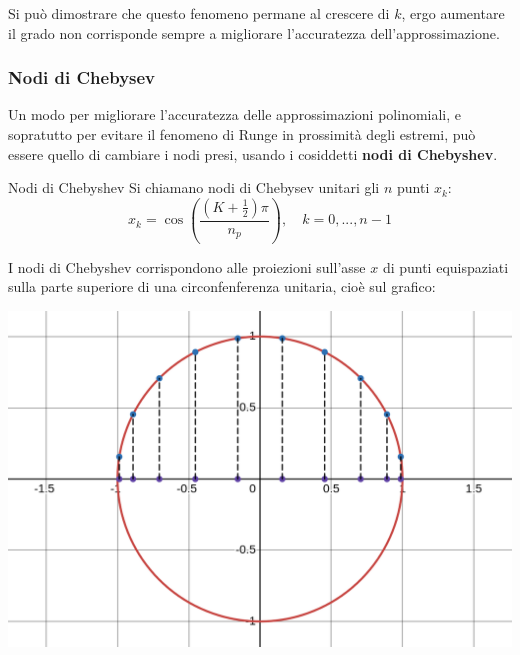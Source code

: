 \documentclass[a4paper,11pt]{article}
\begin{document}
Si può dimostrare che questo fenomeno permane al crescere di $k$, ergo aumentare il grado non corrisponde sempre a migliorare l'accuratezza dell'approssimazione.

\subsubsection{Nodi di Chebysev}
Un modo per migliorare l'accuratezza delle approssimazioni polinomiali, e sopratutto per evitare il fenomeno di Runge in prossimità degli estremi, può essere quello di cambiare i nodi presi, usando i cosiddetti \textbf{nodi di Chebyshev}.

\begin{definition}{Nodi di Chebyshev}
	Si chiamano nodi di Chebysev unitari gli $n$ punti $x_k$:
	$$
	x_k = \cos\left(\frac{\left(K+\frac{1}{2}\right)\pi}{n_{p}}\right), \quad k = 0, ..., n - 1
	$$
\end{definition}

\par\bigskip

\noindent
\begin{minipage}{\textwidth}
I nodi di Chebyshev corrispondono alle proiezioni sull'asse $x$ di punti equispaziati sulla parte superiore di una circonfenferenza unitaria, cioè sul grafico:
\begin{center}
	\includegraphics[scale=0.28]{../figures/chebyshev_nodes.png}
\end{center}
\end{minipage}

\par\bigskip
\end{document}
